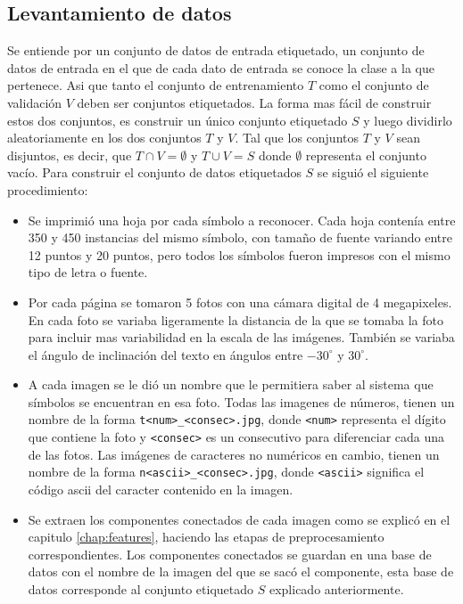 \documentclass[a4paper, 11pt, oneside]{report}
\begin{document}
\subsection{Levantamiento de datos}
Se entiende por un conjunto de datos de entrada etiquetado, un conjunto de datos de entrada en el que de cada dato de entrada se conoce la clase a la que pertenece. Asi que tanto el conjunto de entrenamiento $T$ como el conjunto de validación $V$ deben ser conjuntos etiquetados.\newline \newline
La forma mas fácil de construir estos dos conjuntos, es construir un único conjunto etiquetado $S$ y luego dividirlo aleatoriamente en los dos conjuntos $T$ y $V$. Tal que los conjuntos $T$ y $V$ sean disjuntos, es decir, que $T \cap V = \emptyset$ y $T \cup V = S$ donde $\emptyset$ representa el conjunto vacío.\newline\newline
Para construir el conjunto de datos etiquetados $S$ se siguió el siguiente procedimiento:
\begin{itemize}
	\item Se imprimió una hoja por cada símbolo a reconocer. Cada hoja contenía entre 350 y 450 instancias del mismo símbolo, con tamaño de fuente variando entre 12 puntos y 20 puntos, pero todos los símbolos fueron impresos con el mismo tipo de letra o fuente.
	\item Por cada página se tomaron 5 fotos con una cámara digital de 4 megapixeles. En cada foto se variaba ligeramente la distancia de la que se tomaba la foto para incluir mas variabilidad en la escala de las imágenes. También se variaba el ángulo de inclinación del texto en ángulos entre $-30^\circ$ y $30^\circ$.
	\item A cada imagen se le dió un nombre que le permitiera saber al sistema que símbolos se encuentran en esa foto. Todas las imagenes de números, tienen un nombre de la forma \verb/t<num>_<consec>.jpg/, donde \verb/<num>/ representa el dígito que contiene la foto y \verb/<consec>/ es un consecutivo para diferenciar cada una de las fotos. Las imágenes de caracteres no numéricos en cambio, tienen un nombre de la forma \verb/n<ascii>_<consec>.jpg/, donde \verb/<ascii>/ significa el código ascii del caracter contenido en la imagen.
	\item Se extraen los componentes conectados de cada imagen como se explicó en el capitulo \ref{chap:features}, haciendo las etapas de preprocesamiento correspondientes. Los componentes conectados se guardan en una base de datos con el nombre de la imagen del que se sacó el componente, esta base de datos corresponde al conjunto etiquetado $S$ explicado anteriormente.
\end{itemize}
\end{document}
